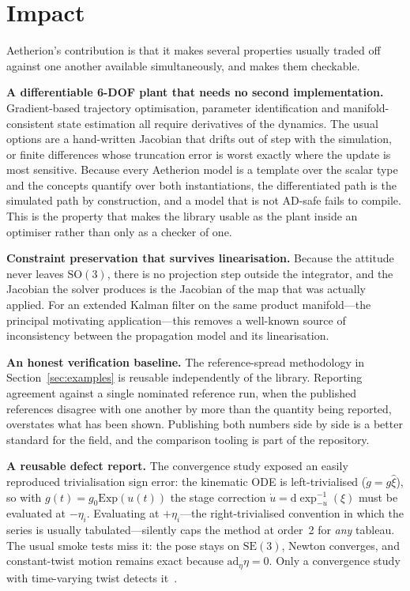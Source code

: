 \documentclass[preprint,12pt,a4paper]{elsarticle}
\newcommand{\SO}{\mathrm{SO}(3)}
\newcommand{\SE}{\mathrm{SE}(3)}
\newcommand{\Exp}{\mathrm{Exp}}
\newcommand{\dexp}{\mathrm{d}\exp}
\newcommand{\ad}{\mathrm{ad}}
\begin{document}
\section{Impact}
\label{sec:impact}

Aetherion's contribution is that it makes several properties usually traded off
against one another available simultaneously, and makes them checkable.

\textbf{A differentiable 6-DOF plant that needs no second implementation.}
Gradient-based trajectory optimisation, parameter identification and
manifold-consistent state estimation all require derivatives of the dynamics.
The usual options are a hand-written Jacobian that drifts out of step with the
simulation, or finite differences whose truncation error is worst exactly where
the update is most sensitive. Because every Aetherion model is a template over
the scalar type and the concepts quantify over both instantiations, the
differentiated path is the simulated path by construction, and a model that is
not AD-safe fails to compile. This is the property that makes the library
usable as the plant inside an optimiser rather than only as a checker of one.

\textbf{Constraint preservation that survives linearisation.} Because the
attitude never leaves $\SO$, there is no projection step outside the
integrator, and the Jacobian the solver produces is the Jacobian of the map
that was actually applied. For an extended Kalman filter on the same product
manifold---the principal motivating application---this removes a well-known
source of inconsistency between the propagation model and its linearisation.

\textbf{An honest verification baseline.} The reference-spread methodology in
Section~\ref{sec:examples} is reusable independently of the library. Reporting
agreement against a single nominated reference run, when the published
references disagree with one another by more than the quantity being reported,
overstates what has been shown. Publishing both numbers side by side is a
better standard for the field, and the comparison tooling is part of the
repository.

\textbf{A reusable defect report.} The convergence study exposed an
easily reproduced trivialisation sign error: the kinematic ODE is
left-trivialised ($\dot g = g\hat\xi$), so with $g(t) = g_0\Exp(u(t))$ the
stage correction $\dot u = \dexp^{-1}_{-u}(\xi)$ must be evaluated at
$-\eta_i$. Evaluating at $+\eta_i$---the right-trivialised convention in which
the series is usually tabulated---silently caps the method at order~2 for
\emph{any} tableau. The usual smoke tests miss it: the pose stays on $\SE$,
Newton converges, and constant-twist motion remains exact because
$\ad_\eta \eta = 0$. Only a convergence study with time-varying twist detects
it~\cite{tuncer2027rkmk}.
\end{document}
